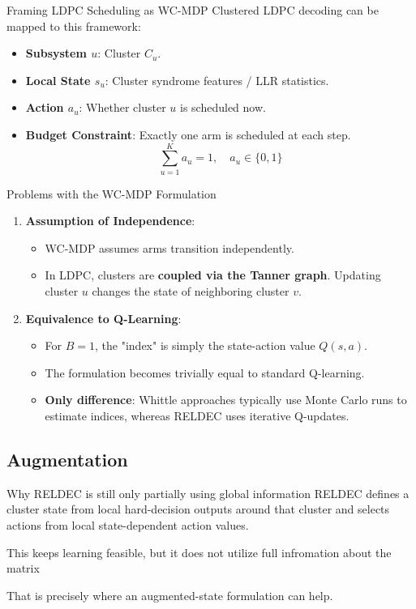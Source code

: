 \documentclass{beamer}
\begin{document}
\begin{frame}{Framing LDPC Scheduling as WC-MDP}
Clustered LDPC decoding can be mapped to this framework:
\begin{itemize}
  \item \textbf{Subsystem $u$}: Cluster $C_u$.
  \item \textbf{Local State $s_u$}: Cluster syndrome features / LLR statistics.
  \item \textbf{Action $a_u$}: Whether cluster $u$ is scheduled now.
  \item \textbf{Budget Constraint}: Exactly one arm is scheduled at each step.
  \[
  \sum_{u=1}^K a_u = 1, \quad a_u \in \{0, 1\}
  \]
\end{itemize}
\end{frame}

\begin{frame}{Problems with the WC-MDP Formulation}
\begin{enumerate}
  \item \textbf{Assumption of Independence}:
  \begin{itemize}
    \item WC-MDP assumes arms transition independently.
    \item In LDPC, clusters are \textbf{coupled via the Tanner graph}. Updating cluster $u$ changes the state of neighboring cluster $v$.
  \end{itemize}
  \item \textbf{Equivalence to Q-Learning}:
  \begin{itemize}
    \item For $B=1$, the "index" is simply the state-action value $Q(s, a)$.
    \item The formulation becomes trivially equal to standard Q-learning.
    \item \textbf{Only difference}: Whittle approaches typically use Monte Carlo runs to estimate indices, whereas RELDEC uses iterative Q-updates.
  \end{itemize}
\end{enumerate}
\end{frame}

\subsection{Augmentation}

\begin{frame}{Why RELDEC is still only partially using global information}
RELDEC defines a cluster state from local hard-decision outputs around that cluster and selects actions from local state-dependent action values.

\vspace{0.4em}
This keeps learning feasible, but it does not utilize full infromation about the matrix

\vspace{0.4em}
That is precisely where an augmented-state formulation can help.
\end{frame}
\end{document}
